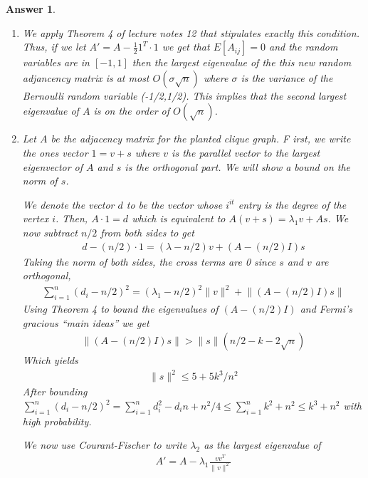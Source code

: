 \documentclass[12pt]{article}
\theoremstyle{colon}
\newtheorem*{answer}{Answer}
\begin{document}
\begin{answer}
  \leavevmode
  \begin{enumerate}[label=\alph*)]
    \item We apply Theorem 4 of lecture notes 12 that stipulates exactly this condition. Thus, if we let $A' = A - \frac{1}{2} 1^T \cdot 1$ we get that $E[A_{ij}] = 0$ and the random variables are in $[-1,1]$ then the largest eigenvalue of the this new random adjancency matrix is at most $O(\sigma \sqrt{n})$ where $\sigma$ is the variance of the Bernoulli random variable (-1/2,1/2). This implies that the second largest eigenvalue of $A$ is on the order of $O(\sqrt{n})$.

    \item  Let $A$ be the adjacency matrix for the planted clique graph. F irst, we write the ones vector $1 = v + s$ where $v$ is the parallel vector to the largest eigenvector of $A$ and $s$ is the orthogonal part. We will show a bound on the norm of $s$.

    We denote the vector $d$ to be the vector whose $i^{it}$ entry is the degree of the vertex $i$. Then, $A \cdot 1 = d$ which is equivalent to $A(v+s) = \lambda_1 v + As$. We now subtract $n/2$ from both sides to get
    \begin{gather*}
      d - (n/2) \cdot 1 = (\lambda - n/2)v + (A - (n/2)I)s
    \end{gather*}
    Taking the norm of both sides, the cross terms are 0 since $s$ and $v$ are orthogonal,
    \begin{gather*}
      \sum_{i=1}^n (d_i -n/2)^2 = (\lambda_1 - n/2)^2 \lVert v \rVert^2 + \lVert (A - (n/2)I) s \rVert
    \end{gather*}
    Using Theorem 4 to bound the eigenvalues  of $(A - (n/2)I)$ and Fermi's gracious ``main ideas'' we get
    \begin{gather*}
      \lVert (A - (n/2)I) s \rVert > \lVert s \rVert (n/2 - k -2 \sqrt{n})
    \end{gather*}
    Which yields
    \begin{gather*}
      \lVert s \rVert^2 \leq 5 + 5k^3/n^2
    \end{gather*}
    After bounding $\sum_{i=1}^n (d_i -n/2)^2 = \sum_{i=1}^n d_i^2 - d_i n + n^2/4 \leq \sum_{i=1}^n k^2 + n^2 \leq k^3 + n^2$ with high probability.

    We now use Courant-Fischer to write $\lambda_2$ as the largest eigenvalue of
    \begin{gather*}
      A' = A - \lambda_1 \frac{v v^T}{\lVert v \rVert^2}
    \end{gather*}


\end{enumerate}
\end{answer}
\end{document}
